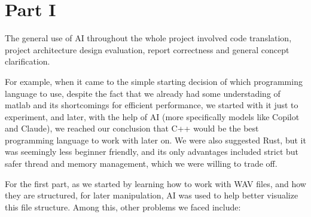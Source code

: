 \chapter{Part I}

The general use of AI throughout the whole project involved code translation, project architecture design evaluation, report correctness and general concept clarification.

For example, when it came to the simple starting decision of which programming language to use, despite the fact that we already had some understading of matlab and its shortcomings for efficient performance, we started with it just to experiment, and later, with the help of AI (more specifically models like Copilot and Claude), we reached our conclusion that C++ would be the best programming language to work with later on. We were also suggested Rust, but it was seemingly less beginner friendly, and its only advantages included strict but safer thread and memory management, which we were willing to trade off.

For the first part, as we started by learning how to work with WAV files, and how they are structured, for later manipulation, AI was used to help better visualize this file structure. Among this, other problems we faced include:

